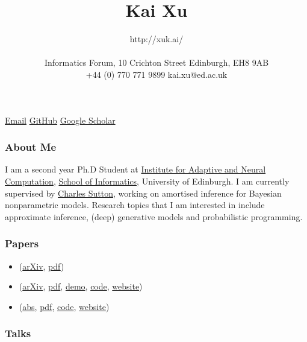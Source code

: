 \documentclass[11pt, a4paper]{article}
\title{Kai Xu} %
\date{} %
\author{http://xuk.ai/\\\\
Informatics Forum, 10 Crichton Street \textbar{} Edinburgh, EH8 9AB\\ %
+44 (0) 770 771 9899 \textbar{} kai.xu@ed.ac.uk } %
\providecommand{\tightlist}{%
  \setlength{\itemsep}{0pt}\setlength{\parskip}{0pt}}
\begin{document}

\maketitle
\begin{raggedright}
\href{mailto:kai.xu@ed.ac.uk}{Email} \textbar{}
\href{http://github.com/xukai92}{GitHub} \textbar{}
\href{https://scholar.google.ca/citations?user=kf3C60wAAAAJ}{Google
Scholar}

\subsubsection{About Me}

I am a second year Ph.D Student at
\href{http://www.anc.ed.ac.uk/}{Institute for Adaptive and Neural
Computation}, \href{https://www.ed.ac.uk/informatics}{School of
Informatics}, University of Edinburgh. I am currently supervised by
\href{http://homepages.inf.ed.ac.uk/csutton/}{Charles Sutton}, working
on amortised inference for Bayesian nonparametric models. Research
topics that I am interested in include approximate inference, (deep)
generative models and probabilistic programming.

\subsubsection{Papers}

\begin{itemize}
\tightlist
\item
  (\href{https://arxiv.org/abs/1806.00101}{arXiv},
  \href{https://arxiv.org/pdf/1806.00101.pdf}{pdf})
\item
  (\href{https://arxiv.org/abs/1803.04042}{arXiv},
  \href{https://arxiv.org/pdf/1803.04042.pdf}{pdf},
  \href{http://xuk.ai/darksight/demo/mnist.html}{demo},
  \href{https://github.com/xukai92/darksight}{code},
  \href{http://xuk.ai/darksight/}{website})
\item
  (\href{http://proceedings.mlr.press/v84/ge18b.html}{abs},
  \href{http://proceedings.mlr.press/v84/ge18b/ge18b.pdf}{pdf},
  \href{https://github.com/yebai/Turing.jl}{code},
  \href{http://turing.guru/}{website})
\end{itemize}

\subsubsection{Talks}


\end{raggedright}
\end{document}
